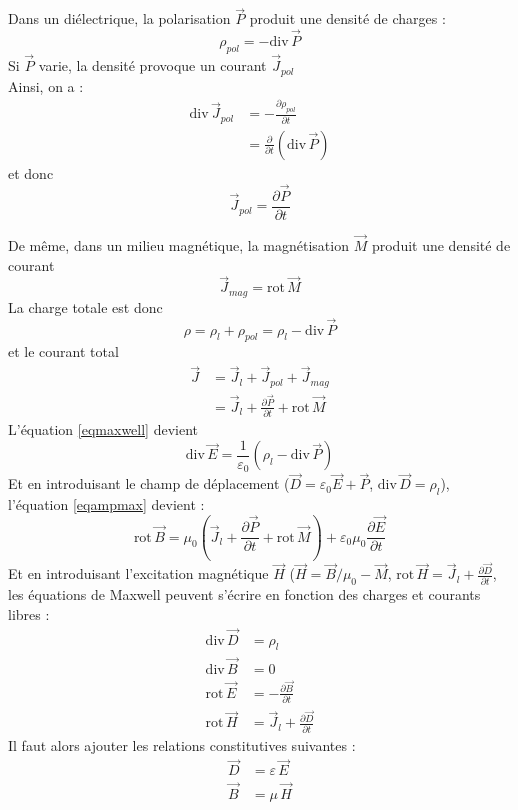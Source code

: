 \documentclass	[11pt, a4paper, openany]{book}
\newcommand{\rot}{\text{rot}\,}
\newcommand{\divv}{\text{div}\,}
\begin{document}
Dans un diélectrique, la polarisation $\vec P$ produit une densité de charges :\begin{equation}
\rho_{pol}=-\divv\vec P
\end{equation}
Si $\vec P$ varie, la densité provoque un courant $\vec J_{pol}$\\
Ainsi, on a :\begin{align}
\divv\vec J_{pol} & =-\frac{\partial \rho_{pol}}{\partial t}\\
 & =\frac{\partial}{\partial t}\left(\divv\vec P\right)
\end{align}
et donc\begin{equation}
\vec J_{pol}=\frac{\partial\vec P}{\partial t}
\end{equation}

De même, dans un milieu magnétique, la magnétisation $\vec M$ produit une densité de courant \begin{equation}
\vec J_{mag}=\rot\vec M
\end{equation}
La charge totale est donc \begin{equation}
\rho=\rho_l+\rho_{pol}=\rho_l-\divv\vec P
\end{equation}
et le courant total \begin{align}
\vec J & =\vec J_l+\vec J_{pol}+\vec J_{mag}\\
 & =\vec J_l+\frac{\partial\vec P}{\partial t}+\rot\vec M
\end{align}
L'équation \eqref{eqmaxwell} devient \begin{equation}
\divv\vec E=\frac{1}{\varepsilon_0}\left(\rho_l-\divv\vec P\right)
\end{equation}
Et en introduisant le champ de déplacement ($\vec D=\varepsilon_0\vec E+\vec P$, $\divv\vec D=\rho_l$), l'équation \eqref{eqampmax} devient : \begin{equation}
\rot\vec B=\mu_0\left(\vec J_l+\frac{\partial \vec P}{\partial t}+\rot\vec M\right)+\varepsilon_0\mu_0\frac{\partial\vec E}{\partial t}
\end{equation}
Et en introduisant l'excitation magnétique $\vec H$ ($\vec H=\vec B/\mu_0-\vec M$, $\rot\vec H=\vec J_l+\frac{\partial\vec D}{\partial t}$, les équations de Maxwell peuvent s'écrire en fonction des charges et courants libres : \begin{align}
\divv\vec D & =\rho_l\\
\divv\vec B & =0\\
\rot\vec E & =-\frac{\partial\vec B}{\partial t}\\
\rot\vec H & =\vec J_l+\frac{\partial\vec D}{\partial t}
\end{align}
Il faut alors ajouter les relations constitutives suivantes :\begin{align}
\vec D & =\varepsilon\,\vec E\\
\vec B & = \mu\,\vec H
\end{align}
\end{document}
